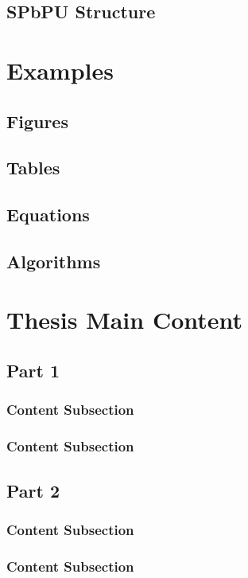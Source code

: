 \documentclass[a4paper,twoside,12pt]{book}
\begin{document}
			\section{SPbPU Structure} 
		\chapter{Examples} 
			\section{Figures} 
			\section{Tables} 
			\section{Equations} 
			\section{Algorithms} 
		\chapter{Thesis Main Content} 
			\section{Part 1}
				\subsection{Content Subsection}
				\subsection{Content Subsection}
			\section{Part 2}
				\subsection{Content Subsection}
				\subsection{Content Subsection}
\end{document}
